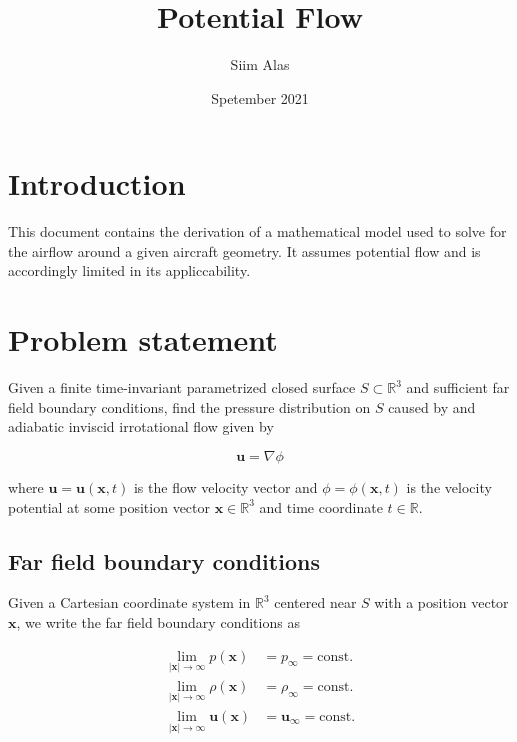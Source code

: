 \documentclass{article}
\title{Potential Flow}
\author{Siim Alas}
\date{Spetember 2021}
\begin{document}
\maketitle

\section*{Introduction}

This document contains the derivation of a mathematical model used to solve for
the airflow around a given aircraft geometry. It assumes potential flow and is
accordingly limited in its appliccability.

\section{Problem statement}

Given a finite time-invariant parametrized closed surface $S \subset
\mathbb{R}^3$ and sufficient far field boundary conditions, find the pressure
distribution on $S$ caused by and adiabatic inviscid irrotational flow given by

\begin{equation}
\label{eq:DefinitionOfPotentialFlow}
	\mathbf{u} = \nabla \phi
\end{equation}

where $\mathbf{u} = \mathbf{u}(\mathbf{x}, t)$ is the flow velocity vector and
$\phi = \phi(\mathbf{x}, t)$ is the velocity potential at some position vector
$\mathbf{x} \in \mathbb{R}^3$ and time coordinate $t \in \mathbb{R}$.

\subsection{Far field boundary conditions}

Given a Cartesian coordinate system in $\mathbb{R}^3$ centered near $S$ with a
position vector $\mathbf{x}$, we write the far field boundary conditions as

\begin{subequations}
	\begin{align}
		\lim_{|\mathbf{x}| \rightarrow \infty} p(\mathbf{x})  & = p_{\infty} =
		\text{const.} \label{eq:FarFieldPressureConstraint} \\
		\lim_{|\mathbf{x}| \rightarrow \infty} \rho(\mathbf{x})  & =
		\rho_{\infty} = \text{const.}
		\label{eq:FarFieldDensityConstraint} \\
		\lim_{|\mathbf{x}| \rightarrow \infty} \mathbf{u}(\mathbf{x}) & =
		\mathbf{u}_{\infty} = \text{const.}
		\label{eq:FarFieldVelocityConstraint}
	\end{align}
\end{subequations}
\end{document}
